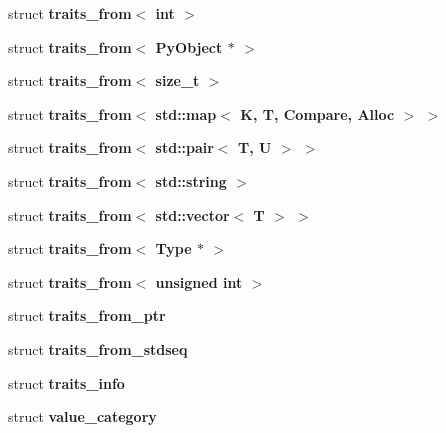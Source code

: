 \begin{DoxyCompactItemize}
\item 
struct {\bf traits\+\_\+from$<$ int $>$}
\item 
struct {\bf traits\+\_\+from$<$ Py\+Object $\ast$ $>$}
\item 
struct {\bf traits\+\_\+from$<$ size\+\_\+t $>$}
\item 
struct {\bfseries traits\+\_\+from$<$ std\+::map$<$ K, T, Compare, Alloc $>$ $>$}
\item 
struct {\bfseries traits\+\_\+from$<$ std\+::pair$<$ T, U $>$ $>$}
\item 
struct {\bfseries traits\+\_\+from$<$ std\+::string $>$}
\item 
struct {\bfseries traits\+\_\+from$<$ std\+::vector$<$ T $>$ $>$}
\item 
struct {\bf traits\+\_\+from$<$ Type $\ast$ $>$}
\item 
struct {\bf traits\+\_\+from$<$ unsigned int $>$}
\item 
struct {\bf traits\+\_\+from\+\_\+ptr}
\item 
struct {\bf traits\+\_\+from\+\_\+stdseq}
\item 
struct {\bf traits\+\_\+info}
\item 
struct {\bf value\+\_\+category}
\end{DoxyCompactItemize}
